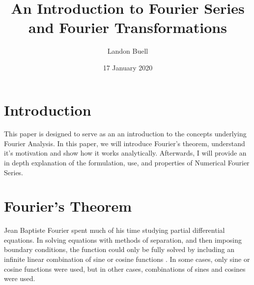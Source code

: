 \documentclass[12pt,letterpaper]{article}
\begin{document}

\title{An Introduction to Fourier Series and Fourier Transformations}
\author{Landon Buell}
\date{17 January 2020}
\maketitle


\section{Introduction}

\paragraph*{}This paper is designed to serve as an an introduction to the concepts underlying Fourier Analysis. In this paper, we will introduce Fourier's theorem, understand it's motivation and show how it works analytically. Afterwards, I will provide an in depth explanation of the formulation, use, and properties of Numerical Fourier Series. 


\section{Fourier's Theorem}

\paragraph*{}Jean Baptiste Fourier spent much of his time studying partial differential equations. In solving equations with methods of separation, and then imposing boundary conditions, the function could only be fully solved by including an infinite linear combination of sine or cosine functions \cite{Haberman}. In some cases, only sine or cosine functions were used, but in other cases, combinations of sines and cosines were used. 
\end{document}
